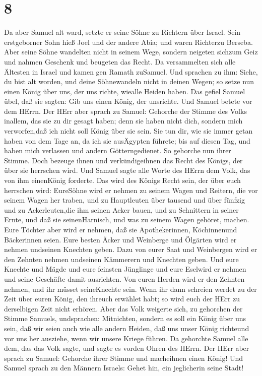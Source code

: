\hypertarget{section-7}{%
\section{8}\label{section-7}}

 Da aber Samuel alt ward, setzte er seine Söhne zu Richtern
über Israel.  Sein erstgeborner Sohn hieß Joel und der
andere Abia; und waren Richterzu Berseba.  Aber seine Söhne
wandelten nicht in seinem Wege, sondern neigeten sichzum Geiz und nahmen
Geschenk und beugeten das Recht.  Da versammelten sich alle
Ältesten in Israel und kamen gen Ramath zuSamuel.  Und
sprachen zu ihm: Siehe, du bist alt worden, und deine Söhnewandeln nicht
in deinen Wegen; so setze nun einen König über uns, der uns richte,
wiealle Heiden haben.  Das gefiel Samuel übel, daß sie
sagten: Gib uns einen König, der unsrichte. Und Samuel betete vor dem
HErrn.  Der HErr aber sprach zu Samuel: Gehorche der Stimme
des Volks inallem, das sie zu dir gesagt haben; denn sie haben nicht
dich, sondern mich verworfen,daß ich nicht soll König über sie sein.
 Sie tun dir, wie sie immer getan haben von dem Tage an, da
ich sie ausÄgypten führete; bis auf diesen Tag, und haben mich verlassen
und andern Götterngedienet.  So gehorche nun ihrer Stimme.
Doch bezeuge ihnen und verkündigeihnen das Recht des Königs, der über
sie herrschen wird.  Und Samuel sagte alle Worte des HErrn
dem Volk, das von ihm einenKönig forderte.  Das wird des
Königs Recht sein, der über euch herrschen wird: EureSöhne wird er
nehmen zu seinem Wagen und Reitern, die vor seinem Wagen her traben,
 und zu Hauptleuten über tausend und über fünfzig und zu
Ackerleuten,die ihm seinen Acker bauen, und zu Schnittern in seiner
Ernte, und daß sie seinenHarnisch, und was zu seinem Wagen gehöret,
machen.  Eure Töchter aber wird er nehmen, daß sie
Apothekerinnen, Köchinnenund Bäckerinnen seien.  Eure
besten Äcker und Weinberge und Ölgärten wird er nehmen undseinen
Knechten geben.  Dazu von eurer Saat und Weinbergen wird er
den Zehnten nehmen undseinen Kämmerern und Knechten geben. 
Und eure Knechte und Mägde und eure feinsten Jünglinge und eure Eselwird
er nehmen und seine Geschäfte damit ausrichten.  Von euren
Herden wird er den Zehnten nehmen, und ihr müsset seineKnechte sein.
 Wenn ihr dann schreien werdet zu der Zeit über euren
König, den ihreuch erwählet habt; so wird euch der HErr zu derselbigen
Zeit nicht erhören.  Aber das Volk weigerte sich, zu
gehorchen der Stimme Samuels, undsprachen: Mitnichten, sondern es soll
ein König über uns sein,  daß wir seien auch wie alle
andern Heiden, daß uns unser König richteund vor uns her ausziehe, wenn
wir unsere Kriege führen.  Da gehorchte Samuel alle dem,
das das Volk sagte, und sagte es vorden Ohren des HErrn. 
Der HErr aber sprach zu Samuel: Gehorche ihrer Stimme und macheihnen
einen König! Und Samuel sprach zu den Männern Israels: Gehet hin, ein
jeglicherin seine Stadt!

